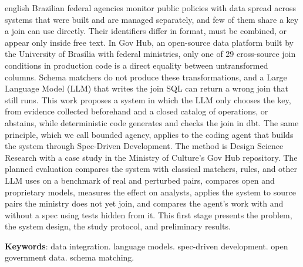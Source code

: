 \begin{resumo}[Abstract]
 \begin{otherlanguage*}{english}
Brazilian federal agencies monitor public policies with data spread across
systems that were built and are managed separately, and few of them share a
key a join can use directly. Their identifiers differ in format, must be
combined, or appear only inside free text. In Gov Hub, an open-source data
platform built by the University of Brasília with federal ministries, only
one of 29 cross-source join conditions in production code is a direct
equality between untransformed columns. Schema matchers do not produce these
transformations, and a Large Language Model (LLM) that writes the join SQL
can return a wrong join that still runs. This work proposes a system in which
the LLM only chooses the key, from evidence collected beforehand and a closed
catalog of operations, or abstains, while deterministic code generates and
checks the join in dbt. The same principle, which we call bounded agency,
applies to the coding agent that builds the system through Spec-Driven
Development. The method is Design Science Research with a case study in the
Ministry of Culture's Gov Hub repository. The planned evaluation compares the
system with classical matchers, rules, and other LLM uses on a benchmark of
real and perturbed pairs, compares open and proprietary models, measures the
effect on analysts, applies the system to source pairs the ministry does not
yet join, and compares the agent's work with and without a spec using tests
hidden from it. This first stage presents the problem, the system design, the
study protocol, and preliminary results.

   \vspace{\onelineskip}

   \noindent
   \textbf{Keywords}: data integration. language models. spec-driven
   development. open government data. schema matching.
 \end{otherlanguage*}
\end{resumo}

